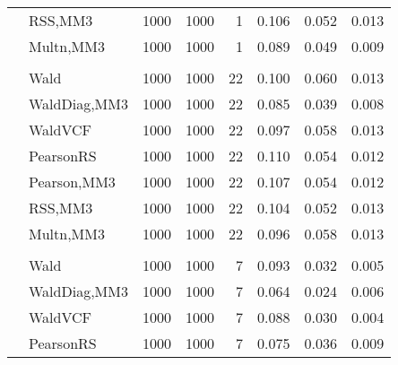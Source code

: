 \documentclass[
]{article}
\begin{document}
\begin{table}[H]
{\begin{tabular}[t]{llrrrrrr}
\hspace{1em} & RSS,MM3 & 1000 & 1000 & 1 & 0.106 & 0.052 & 0.013\\

\hspace{1em} & Multn,MM3 & 1000 & 1000 & 1 & 0.089 & 0.049 & 0.009\\
\cmidrule{1-8}
\addlinespace[0.3em]
\multicolumn{8}{l}{\textbf{1F 15V}}\\
\hspace{1em} & Wald & 1000 & 1000 & 22 & 0.100 & 0.060 & 0.013\\

\hspace{1em} & WaldDiag,MM3 & 1000 & 1000 & 22 & 0.085 & 0.039 & 0.008\\

\hspace{1em} & WaldVCF & 1000 & 1000 & 22 & 0.097 & 0.058 & 0.013\\

\hspace{1em} & PearsonRS & 1000 & 1000 & 22 & 0.110 & 0.054 & 0.012\\

\hspace{1em} & Pearson,MM3 & 1000 & 1000 & 22 & 0.107 & 0.054 & 0.012\\

\hspace{1em} & RSS,MM3 & 1000 & 1000 & 22 & 0.104 & 0.052 & 0.013\\

\hspace{1em} & Multn,MM3 & 1000 & 1000 & 22 & 0.096 & 0.058 & 0.013\\
\cmidrule{1-8}
\addlinespace[0.3em]
\multicolumn{8}{l}{\textbf{2F 10V}}\\
\hspace{1em} & Wald & 1000 & 1000 & 7 & 0.093 & 0.032 & 0.005\\

\hspace{1em} & WaldDiag,MM3 & 1000 & 1000 & 7 & 0.064 & 0.024 & 0.006\\

\hspace{1em} & WaldVCF & 1000 & 1000 & 7 & 0.088 & 0.030 & 0.004\\

\hspace{1em} & PearsonRS & 1000 & 1000 & 7 & 0.075 & 0.036 & 0.009\\


\end{tabular}}
\end{table}
\end{document}

